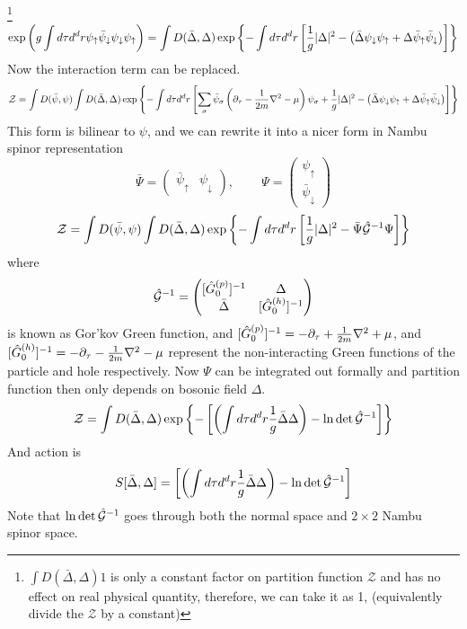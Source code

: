 \footnote{$\int{D(\bar\Delta,\Delta)}1$ is only a constant factor on partition function $\mathcal{Z}$ and has no effect on real physical quantity, therefore, we can take it as 1, (equivalently divide the $\mathcal{Z}$ by a constant)}
\begin{equation}
\exp\left(g\int{d\tau{}d^{d}r}\psi_{\uparrow}\bar\psi_{\downarrow}\psi_{\downarrow}\psi_{\uparrow}\right)=
\int{D(\bar\Delta,\Delta)}\exp\left\{-\int{d\tau{d^{d}r}}\left[\frac{1}{g}\lvert{\Delta}\rvert^{2}-\left(\bar\Delta\psi_{\downarrow}\psi_{\uparrow}+\Delta\bar\psi_{\uparrow}\bar\psi_{\downarrow}\right)\right]\right\}
\end{equation}
Now the interaction term can be replaced.
\begin{equation*}
\mathcal{Z}=\int{D(\bar\psi,\psi)\int{D(\bar\Delta,\Delta)}\exp\ensuremath{\left\{-\int{d\tau{d^{d}r}}\left[\sum_{\sigma}\bar\psi_{\sigma}\left(\partial_{\tau}-\frac{1}{2m}\nabla^{2}-\mu\right)\psi_{\sigma}+\frac{1}{g}\lvert{\Delta}\rvert^{2}-\left(\bar\Delta\psi_{\downarrow}\psi_{\uparrow}+\Delta\bar\psi_{\uparrow}\bar\psi_{\downarrow}\right)\right]\right\}}}
\end{equation*}
This form is bilinear to $\psi$, and we can rewrite it into a nicer form in Nambu spinor representation
\begin{equation}
\bar\Psi=\begin{pmatrix}\bar{\psi}_{\uparrow}&\psi_{\downarrow}\end{pmatrix}\text{,  }\qquad
\Psi=\begin{pmatrix}{\psi}_{\uparrow}\\\bar\psi_{\downarrow}\end{pmatrix}
\end{equation}
\begin{equation}
\mathcal{Z}=\int{D(\bar\psi,\psi)}\int{D(\bar\Delta,\Delta)}\exp
	\left\{-\int{d\tau{d^{d}r}}\left[\frac{1}{g}\lvert{\Delta}\rvert^{2}-\bar\Psi \hat{\mathcal{G}}^{-1}\Psi\right]\right\}
\end{equation}
where 
\begin{equation}\label{eq:pathInt:nG}
\hat{\mathcal{G}}^{-1}=\begin{pmatrix}
[\hat{G}_{0}^{(p)}]^{-1}&\Delta\\\bar\Delta&[\hat{G}_{0}^{(h)}]^{-1}
\end{pmatrix}
\end{equation}
is known as Gor'kov Green function, and $[\hat{G}_{0}^{(p)}]^{-1}=-\partial_{\tau}+\frac{1}{2m}\nabla^{2}+\mu$, and $[\hat{G}_{0}^{(h)}]^{-1}=-\partial_{\tau}-\frac{1}{2m}\nabla^{2}-\mu$ represent the non-interacting Green functions of the particle and hole respectively. Now $\Psi$ can be integrated out formally and partition function then only depends on bosonic field $\Delta$.
\begin{equation}\label{eq:pathInt:DeltaPF}
\mathcal{Z}=\int{D(\bar\Delta,\Delta)}\exp
	\left\{-\left[\left(\int{d\tau{d^{d}r}}\frac{1}{g}{\bar\Delta\Delta}\right)-\ln\det\hat{\mathcal{G}}^{-1}\right]\right\}
\end{equation}
And action is
\begin{equation}\label{eq:pathInt:DeltaAction}
S[\bar\Delta,\Delta]=
	{\left[\left(\int{d\tau{d^{d}r}}\frac{1}{g}{\bar\Delta\Delta}\right)-\ln\det\hat{\mathcal{G}}^{-1}\right]}
\end{equation}
Note that $\ln\det\hat{\mathcal{G}}^{-1}$ goes through both the normal space and $2\times2$ Nambu spinor space.  

